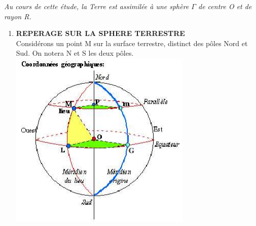
\begin{multicols}{2}
\textit{Au cours de cette étude, la Terre est assimilée à une sphère $\Gamma$ de centre O et de rayon R.}

\medskip

\begin{enumerate}
\item \textbf{REPERAGE SUR LA SPHERE TERRESTRE}\\

Considérons un point M sur la surface terrestre,
distinct des pôles Nord et Sud.
On notera N et S les deux pôles.\\

\includegraphics[scale=1]{RepE-coordonneesspheriques.png}



\end{enumerate}
\end{multicols}
